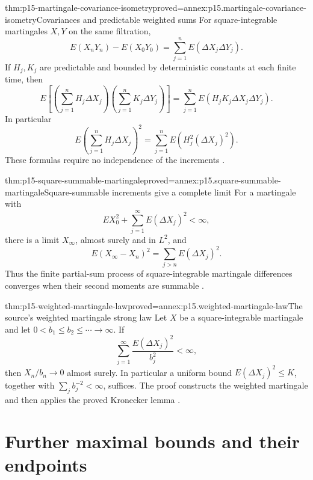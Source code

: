 \begin{hbtheorem}{thm:p15-martingale-covariance-isometry}{proved=annex:p15.martingale-covariance-isometry}{Covariances and predictable weighted sums}
For square-integrable martingales \(X,Y\) on the same filtration,
\[
        E(X_nY_n)-E(X_0Y_0)
                        =\sum_{j=1}^nE(\Delta X_j\Delta Y_j).
\]
If \(H_j,K_j\) are predictable and bounded by deterministic constants
at each finite time, then
\[
 E\left[\left(\sum_{j=1}^nH_j\Delta X_j\right)
         \left(\sum_{j=1}^nK_j\Delta Y_j\right)\right]
                    =\sum_{j=1}^nE(H_jK_j\Delta X_j\Delta Y_j).
\]
In particular
\[
                 E\left(\sum_{j=1}^nH_j\Delta X_j\right)^2
                                =\sum_{j=1}^nE(H_j^2(\Delta X_j)^2).
\]
These formulas require no independence of the increments
\cite[ex.~4.4.9]{DurrettPTEAuthor2019}.
\end{hbtheorem}

\begin{hbtheorem}{thm:p15-square-summable-martingale}{proved=annex:p15.square-summable-martingale}{Square-summable increments give a complete limit}
For a martingale with
\[
                       EX_0^2+\sum_{j=1}^\infty E(\Delta X_j)^2<\infty,
\]
there is a limit \(X_\infty\), almost surely and in \(L^2\), and
\[
                  E(X_\infty-X_n)^2
                                =\sum_{j>n}E(\Delta X_j)^2.
\]
Thus the finite partial-sum process of square-integrable martingale
differences converges when their second moments are summable
\cite[ex.~4.4.10]{DurrettPTEAuthor2019}.
\end{hbtheorem}

\begin{hbtheorem}{thm:p15-weighted-martingale-law}{proved=annex:p15.weighted-martingale-law}{The source's weighted martingale strong law}
Let \(X\) be a square-integrable martingale and let
\(0<b_1\leq b_2\leq\cdots\to\infty\).
If
\[
                           \sum_{j=1}^\infty
                                  \frac{E(\Delta X_j)^2}{b_j^2}<\infty,
\]
then \(X_n/b_n\to0\) almost surely.
In particular a uniform bound \(E(\Delta X_j)^2\leq K\), together
with \(\sum_jb_j^{-2}<\infty\), suffices.
The proof constructs the weighted martingale and then applies the
proved Kronecker lemma \cite[ex.~4.4.11]{DurrettPTEAuthor2019}.
\end{hbtheorem}

\section{Further maximal bounds and their endpoints}
\label{sec:p15-maximal-refinements}


